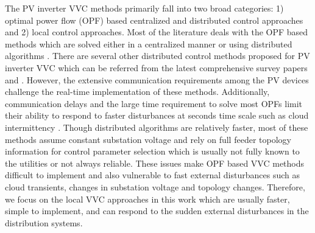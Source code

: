 \documentclass[journal]{IEEEtran}
\begin{document}
The PV inverter VVC methods primarily fall into two broad categories: 1) optimal power flow (OPF) based centralized and distributed control approaches and 2) local control approaches. Most of the literature deals with the OPF based methods which are solved either in a centralized manner \cite{xu_multi-timescale_2017,dallanese_optimal_2014,yeh_adaptive_2012,farivar_optimal_2012} or using distributed algorithms \cite{zheng_fully_2016,zhang_optimal_2015,chen_robust_2017,robbins_two-stage_2013,turitsyn_distributed_2010}. There are several other distributed control methods proposed for PV inverter VVC which can be referred from the latest comprehensive survey papers \cite{antoniadou-plytaria_distributed_2017} and \cite{molzahn_survey_2017}.  However, the extensive communication requirements among the PV devices challenge the real-time implementation of these methods. Additionally, communication delays and the large time requirement to solve most OPFs limit their ability to respond to faster disturbances at seconds time scale such as cloud intermittency \cite{turitsyn_options_2011,carvalho_distributed_2008,zhu_fast_2016}. Though distributed algorithms are relatively faster, most of these methods assume constant substation voltage and rely on full feeder topology information for control parameter selection which is usually not fully known to the utilities or not always reliable. These issues make OPF based VVC methods difficult to implement and also vulnerable to fast external disturbances such as cloud transients, changes in substation voltage and topology changes. Therefore, we focus on the local VVC approaches in this work which are usually faster, simple to implement, and can respond to the sudden external disturbances in the distribution systems.
\end{document}
